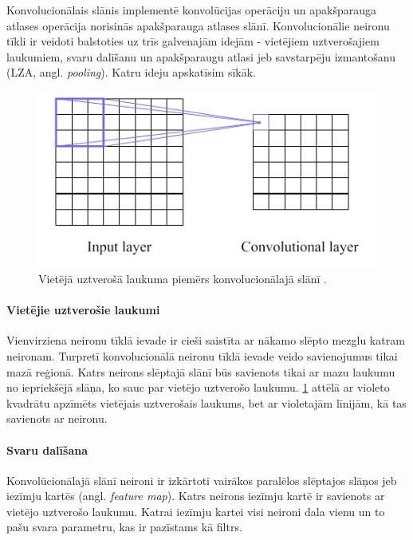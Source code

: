 \documentclass[12pt,paper=a4]{report}
\begin{document}
Konvolucionālais slānis implementē konvolūcijas operāciju un apakšparauga atlases operācija norisinās apakšparauga atlases slānī. Konvolucionālie neironu tīkli ir veidoti balstoties uz trīs galvenajām idejām - vietējiem uztverošajiem laukumiem, svaru dalīšanu un apakšparaugu atlasi jeb savstarpēju izmantošanu (LZA, angl. \textit{pooling}). Katru ideju apskatīsim sīkāk. \cite{convolutionalNN}\par
\begin{figure}[h!]
\centering
\includegraphics[width=.6\linewidth]{localReceptiveField}
\caption{Vietējā uztverošā laukuma piemērs konvolucionālajā slānī \cite{convolutionalNN}.}
\label{fig:localReceptiveField1}
\end{figure}
\paragraph{Vietējie uztverošie laukumi}Vienvirziena neironu tīklā ievade ir cieši saistīta ar nākamo slēpto mezglu katram neironam. Turpretī konvolucionālā neironu tīklā ievade veido savienojumus tikai mazā reģionā. Katrs neirons slēptajā slānī būs savienots tikai ar mazu laukumu no iepriekšējā slāņa, ko sauc par vietējo uztverošo laukumu. \ref{fig:localReceptiveField1} attēlā ar violeto kvadrātu apzīmēts vietējais uztverošais laukums, bet ar violetajām līnijām, kā tas savienots ar neironu. \cite{convolutionalNN}
\paragraph{Svaru dalīšana} Konvolūcionālajā slānī neironi ir izkārtoti vairākos paralēlos slēptajos slāņos jeb iezīmju kartēs (angl. \textit{feature map}). Katrs neirons iezīmju kartē ir savienots ar vietējo uztverošo laukumu. Katrai iezīmju kartei visi neironi dala vienu un to pašu svara parametru, kas ir pazīstams kā filtrs.\cite{convolutionalNN}
\end{document}
